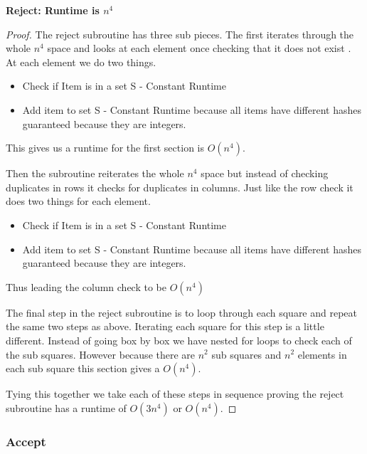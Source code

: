 \documentclass{sig-alternate}
\begin{document}
\textbf{Reject: Runtime is $n^4$}
\begin{proof}
The reject subroutine has three sub pieces. The first iterates through the whole $n^4$ space and looks at each element once checking that it does not exist . At each element we do two things.
\begin{itemize}
\item{Check if Item is in a set S - Constant Runtime}
\item{Add item to set S - Constant Runtime because all items have different hashes guaranteed because they are integers.}
\end{itemize}

This gives us a runtime for the first section is $O(n^4)$.

Then the subroutine reiterates the whole $n^4$ space but instead of checking duplicates in rows it checks for duplicates in columns. Just like the row check it does two things for each element. 
\begin{itemize}
\item{Check if Item is in a set S - Constant Runtime}
\item{Add item to set S - Constant Runtime because all items have different hashes guaranteed because they are integers.}
\end{itemize}
Thus leading the column check to be $O(n^4)$

The final step in the reject subroutine is to loop through each square and repeat the same two steps as above. Iterating each square for this step is a little different. Instead of going box by box we have nested for loops to check each of the sub squares. However because there are $n^2$ sub squares and $n^2$ elements in each sub square this section gives a $O(n^4)$.

Tying this together we take each of these steps in sequence proving the reject subroutine has a runtime of $O(3n^4)$ or $O(n^4)$.
\end{proof}

\subsubsection{Accept}
\end{document}
